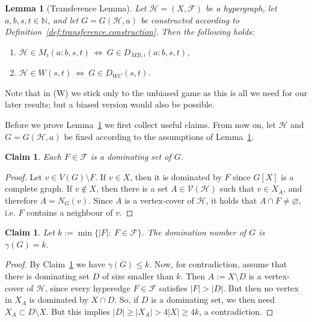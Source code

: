 \documentclass[reqno, 12pt]{amsart}
\numberwithin{equation}{section}
\numberwithin{figure}{section}
\newtheorem{lemma}[theorem]{Lemma}
\newtheorem{claim}[theorem]{Claim}
\newcommand{\calH}{\mathcal{H}}
\newcommand{\calF}{\mathcal{F}}
\newcommand{\calV}{\mathcal{V}}
\begin{document}
\begin{lemma}[Transference Lemma]\label{lemma:from.H.to.G}
Let $\calH =(X,\mathcal{F})$ be a hypergraph, 
let $a,b,s,t\in\mathbb{N}$, and let $G=G(\mathcal{H},a)$ be constructed according to Definition~\ref{def:transference.construction}. 
Then the following holds:
\begin{enumerate}
\item[(M)] $\mathcal{H} \in M_i(a:b,s,t) ~ \Leftrightarrow ~ G \in D_{MB,i}(a:b,s,t)$,
\item[(W)] $\mathcal{H} \in W(s,t) ~ \Leftrightarrow ~ G \in D_{WC}(s,t)$.
\end{enumerate}
\end{lemma}

Note that in (W) we stick only to the unbiased game as this is all we need for our later results; but a biased version would also be possible.

Before we prove Lemma~\ref{lemma:from.H.to.G} we first collect
useful claims. From now on, let $\calH$ and $G=G(\calH,a)$
be fixed according to the assumptions of
Lemma~\ref{lemma:from.H.to.G}.

\begin{claim}\label{clm:transference.claim1}
Each $F\in \calF$ is a dominating set of $G$.
\end{claim}

\begin{proof}
Let $v\in V(G)\setminus F$.
If $v\in X$, then it is dominated by $F$ since $G[X]$ is a complete graph.
If $v\notin X$, then there is a set $A\in \calV(\calH)$
such that $v\in X_A$, and therefore $A=N_G(v)$. Since $A$ is a vertex-cover of $\mathcal{H}$, it holds that
$A\cap F\neq \varnothing$, i.e. $F$ contains a neighbour of $v$.
\end{proof}

\begin{claim}\label{clm:transference.claim2}
Let $k:=\min\{|F|:~F\in\mathcal{F}\}$.
The domination number of $G$ is $\gamma(G)=k$.
\end{claim}

\begin{proof}
By Claim~\ref{clm:transference.claim1} we have $\gamma(G)\leq k$. Now, for contradiction, assume that there is dominating set $D$ of size smaller than $k$. Then $A:=X\setminus D$ is a vertex-cover of $\calH$, since every hyperedge $F\in \calF$ satisfies $|F|>|D|$. 
But then no vertex in $X_A$ is dominated by $X\cap D$.
So, if $D$ is a dominating set, we then need
$X_A\subset D\setminus X$. But this implies
$|D|\geq |X_A| > 4|X| \geq 4k$, a contradiction.
\end{proof}
\end{document}

